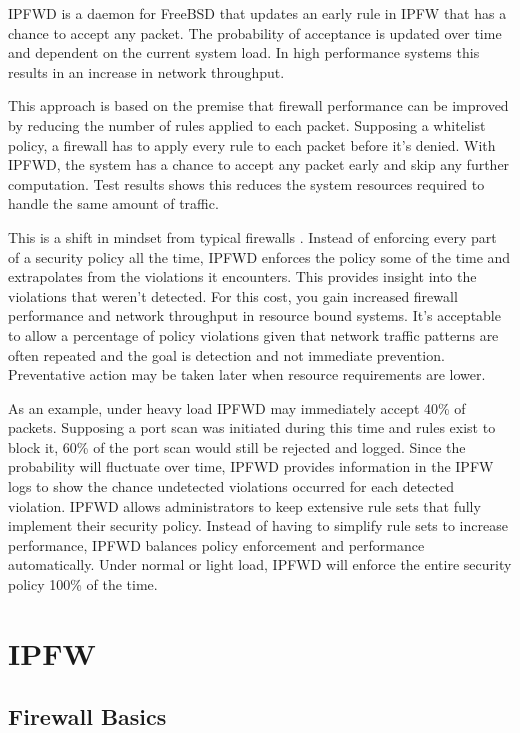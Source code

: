 \documentclass[journal]{IEEEtran}
\begin{document}
  IPFWD is a daemon for FreeBSD that updates an early rule in IPFW that has a
  chance to accept any packet. The probability of acceptance is updated over
  time and dependent on the current system load. In high performance systems
  this results in an increase in network throughput.

  This approach is based on the premise that firewall performance can be
  improved by reducing the number of rules applied to each packet. Supposing a
  whitelist policy, a firewall has to apply every rule to each packet before
  it's denied.  With IPFWD, the system has a chance to accept any packet early
  and skip any further computation. Test results shows this reduces the system
  resources required to handle the same amount of traffic.

  This is a shift in mindset from typical firewalls \cite{networksecurity}.
  Instead of enforcing every part of a security policy all the time, IPFWD
  enforces the policy some of the time and extrapolates from the violations it
  encounters.  This provides insight into the violations that weren't detected.
  For this cost, you gain increased firewall performance and network throughput
  in resource bound systems. It's acceptable to allow a percentage of policy
  violations given that network traffic patterns are often repeated and the
  goal is detection and not immediate prevention. Preventative action may be
  taken later when resource requirements are lower.

  As an example, under heavy load IPFWD may immediately accept 40\% of packets.
  Supposing a port scan was initiated during this time and rules exist to block
  it, 60\% of the port scan would still be rejected and logged. Since the
  probability will fluctuate over time, IPFWD provides information in the IPFW
  logs to show the chance undetected violations occurred for each detected
  violation. IPFWD allows administrators to keep extensive rule sets that fully
  implement their security policy. Instead of having to simplify rule sets to
  increase performance, IPFWD balances policy enforcement and performance
  automatically. Under normal or light load, IPFWD will enforce the entire
  security policy 100\% of the time.

\section{IPFW}

  \subsection{Firewall Basics}
\end{document}
